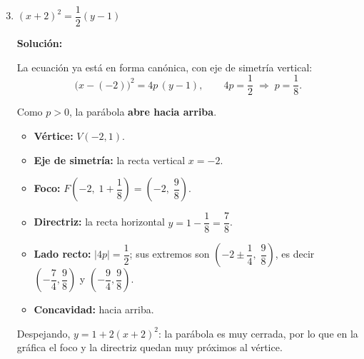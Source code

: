 \documentclass[12pt]{article}
\newcommand{\solucion}{%
    \vspace{0.8em}%
    \textbf{Solución:}%
    \vspace{0.8em}%
}
\begin{document}
\begin{enumerate}[label=\alph*.-]

    \setcounter{enumi}{2} %

    \item $(x+2)^{2}=\dfrac12(y-1)$

    \solucion

    La ecuación ya está en forma canónica, con eje de simetría vertical:
    \[
    \big(x-(-2)\big)^{2}=4p\,(y-1),
    \qquad
    4p=\frac12
    \;\Longrightarrow\;
    p=\frac18 .
    \]

    Como $p>0$, la parábola \textbf{abre hacia arriba}.

    \begin{itemize}[leftmargin=2em, itemsep=0.1em]
        \item \textbf{Vértice:} $V(-2,1)$.
        \item \textbf{Eje de simetría:} la recta vertical $x=-2$.
        \item \textbf{Foco:} $F\left(-2,\;1+\dfrac18\right)
        =\left(-2,\;\dfrac98\right)$.
        \item \textbf{Directriz:} la recta horizontal
        $y=1-\dfrac18=\dfrac78$.
        \item \textbf{Lado recto:} $|4p|=\dfrac12$; sus extremos son
        $\left(-2\pm\dfrac14,\;\dfrac98\right)$, es decir
        $\left(-\dfrac74,\dfrac98\right)$ y
        $\left(-\dfrac94,\dfrac98\right)$.
        \item \textbf{Concavidad:} hacia arriba.
    \end{itemize}

    Despejando, $y=1+2(x+2)^{2}$: la parábola es muy cerrada, por lo que en la
    gráfica el foco y la directriz quedan muy próximos al vértice.

    \begin{center}
    \end{center}


\end{enumerate}
\end{document}
